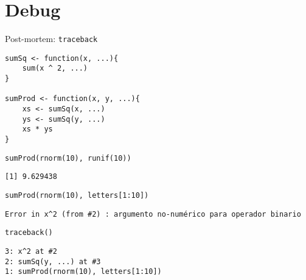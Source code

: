 \documentclass[xcolor={usenames,svgnames,dvipsnames}]{beamer}
\begin{document}
\section{Debug}
\label{sec:orgheadline26}

\begin{frame}[fragile,label={sec:orgheadline21}]{Post-mortem: \texttt{traceback}}
 \lstset{language=R,label= ,caption= ,captionpos=b,numbers=none}
\begin{lstlisting}
sumSq <- function(x, ...){
    sum(x ^ 2, ...)
}

sumProd <- function(x, y, ...){
    xs <- sumSq(x, ...)
    ys <- sumSq(y, ...)
    xs * ys
}
\end{lstlisting}

\lstset{language=R,label= ,caption= ,captionpos=b,numbers=none}
\begin{lstlisting}
sumProd(rnorm(10), runif(10))
\end{lstlisting}

\begin{verbatim}
[1] 9.629438
\end{verbatim}

\lstset{language=R,label= ,caption= ,captionpos=b,numbers=none}
\begin{lstlisting}
sumProd(rnorm(10), letters[1:10])
\end{lstlisting}

\begin{verbatim}
Error in x^2 (from #2) : argumento no-numérico para operador binario
\end{verbatim}

\lstset{language=R,label= ,caption= ,captionpos=b,numbers=none}
\begin{lstlisting}
traceback()
\end{lstlisting}

\begin{verbatim}
3: x^2 at #2
2: sumSq(y, ...) at #3
1: sumProd(rnorm(10), letters[1:10])
\end{verbatim}
\end{frame}
\end{document}
